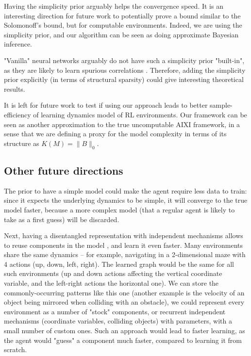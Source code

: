 \documentclass[a4paper,11pt,oneside]{report}
\begin{document}
Having the simplicity prior arguably helps the convergence speed.
It is an interesting direction for future work to potentially prove a bound similar to the Solomonoff's bound, but for computable environments.
Indeed, we are using the simplicity prior, and our algorithm can be seen as doing approximate Bayesian inference.

"Vanilla" neural networks arguably do not have such a simplicity prior "built-in", as they are likely to learn spurious correlations \cite{ilyas2019adversarial}. Therefore, adding the simplicity prior explicitly (in terms of structural sparsity) could give interesting theoretical results.

It is left for future work to test if using our approach leads to better sample-efficiency of learning dynamics model of RL environments.
Our framework can be seen as another approximation \cite{Veness2010} to the true uncomputable AIXI framework, in a sense that we are defining a proxy for the model complexity in terms of its structure as $K(M)=\|B\|_0$.

\subsection{Other future directions}
The prior to have a simple model could make the agent require less data to train: since it expects the underlying dynamics to be simple, it will converge to the true model faster, because a more complex model (that a regular agent is likely to take as a first guess) will be discarded.

Next, having a disentangled representation with independent mechanisms allows to reuse components in the model \cite{Bengio2012,Veerapaneni2019,Didolkar2021,Gomez2006}, and learn it even faster. Many environments share the same dynamics -- for example, navigating in a 2-dimensional maze with 4 actions (up, down, left, right). The learned graph would be the same for all such environments (up and down actions affecting the vertical coordinate variable, and the left-right actions the horizontal one). We can store the commonly-occurring patterns like this one (another example is the velocity of an object being mirrored when colliding with an obstacle), we could represent every environment as a number of "stock" components, or recurrent independent mechanisms (coordinate variables, colliding objects) with parameters, with a small number of custom ones. Such an approach would lead to faster learning, as the agent would "guess" a component much faster, compared to learning it from scratch.
\end{document}
